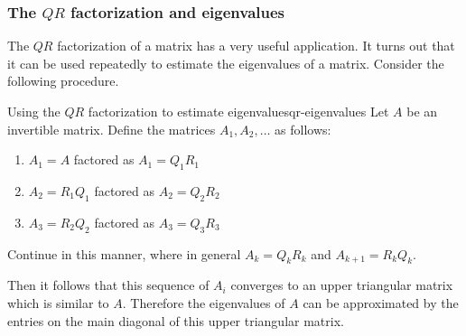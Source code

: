 \subsubsection{The $QR$ factorization and eigenvalues}

The $QR$ factorization of a matrix has a very useful application. It turns out that it can be used repeatedly to estimate the eigenvalues of a matrix. Consider the following procedure.

\begin{procedure}{Using the $QR$ factorization to estimate eigenvalues}{qr-eigenvalues}
Let $A$ be an invertible matrix. Define the matrices $A_1, A_2, \ldots$ as follows:
\begin{enumerate}
\item 
$A_1 = A$ factored as $A_1 = Q_1R_1$
\item 
$A_2 = R_1Q_1$ factored as $A_2 = Q_2R_2$
\item 
$A_3 = R_2Q_2$ factored as $A_3 = Q_3R_3$
\end{enumerate}

Continue in this manner, where in general $A_k = Q_kR_k$ and $A_{k+1} = R_kQ_k$. 

Then it follows that this sequence of $A_i$ converges to an upper triangular matrix which is similar to $A$. Therefore the eigenvalues of $A$ can be approximated by the entries on the main diagonal of this upper triangular matrix. 
\end{procedure}
